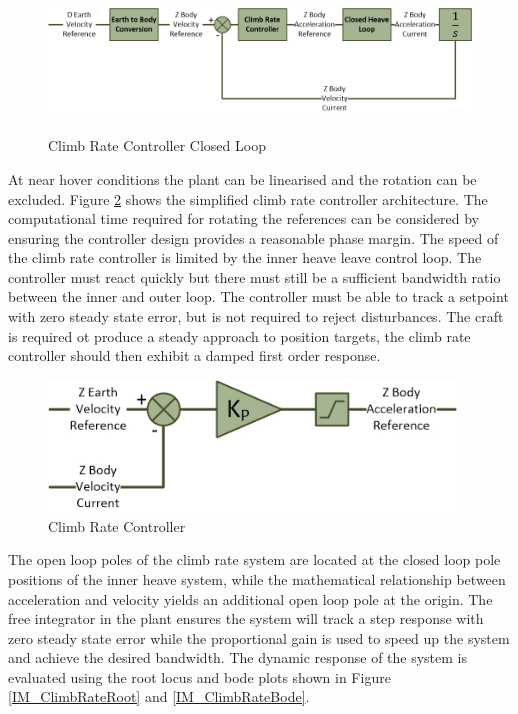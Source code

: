 	 \begin{figure}[H]
	 	\centering
	 	\includegraphics[height = 3.75cm]{../References/Diagrams/ClimbRateLoop.jpg}
	 	\caption{Climb Rate Controller Closed Loop}
	 	\label{IM_ClimbRateControlLoop}
	 \end{figure}
	 
	 At near hover conditions the plant can be linearised and the rotation can be excluded. Figure \ref{IM_ClimbRateController} shows the simplified climb rate controller architecture. The computational time required for rotating the references can be considered by ensuring the controller design provides a reasonable phase margin. The speed of the climb rate controller is limited by the inner heave leave control loop. The controller must react quickly but there must still be a sufficient bandwidth ratio between the inner and outer loop. The controller must be able to track a setpoint with zero steady state error, but is not required to reject disturbances. The craft is required ot produce a steady approach to position targets, the climb rate controller should then exhibit a damped first order response.
	 
	 \begin{figure}[H]
	 	\centering
	 	\includegraphics[height = 3.5cm]{../References/Diagrams/ClimbRateController.jpg}
	 	\caption{Climb Rate Controller}
	 	\label{IM_ClimbRateController}
	 \end{figure}		
	 
	 The open loop poles of the climb rate system are located at the closed loop pole positions of the inner heave system, while the mathematical relationship between acceleration and velocity yields an additional open loop pole at the origin. The free integrator in the plant ensures the system will track a step response with zero steady state error while the proportional gain is used to speed up the system and achieve the desired bandwidth. The dynamic response of the system is evaluated using the root locus and bode plots shown in Figure \ref{IM_ClimbRateRoot} and \ref{IM_ClimbRateBode}.
	 
